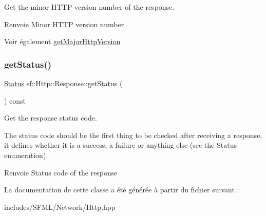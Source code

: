 Get the minor H\+T\+TP version number of the response. 

\begin{DoxyReturn}{Renvoie}
Minor H\+T\+TP version number
\end{DoxyReturn}
\begin{DoxySeeAlso}{Voir également}
\hyperlink{classsf_1_1Http_1_1Response_ab1c6948f6444fad34d0537e206e398b8}{get\+Major\+Http\+Version} 
\end{DoxySeeAlso}
\mbox{\label{classsf_1_1Http_1_1Response_a4271651703764fd9a7d2c0315aff20de}} 
\subsubsection{\texorpdfstring{get\+Status()}{getStatus()}}
{\footnotesize\ttfamily \hyperlink{classsf_1_1Http_1_1Response_a663e071978e30fbbeb20ed045be874d8}{Status} sf\+::\+Http\+::\+Response\+::get\+Status (\begin{DoxyParamCaption}{ }\end{DoxyParamCaption}) const}



Get the response status code. 

The status code should be the first thing to be checked after receiving a response, it defines whether it is a success, a failure or anything else (see the Status enumeration).

\begin{DoxyReturn}{Renvoie}
Status code of the response 
\end{DoxyReturn}


La documentation de cette classe a été générée à partir du fichier suivant \+:\begin{DoxyCompactItemize}
\item 
includes/\+S\+F\+M\+L/\+Network/Http.\+hpp\end{DoxyCompactItemize}
